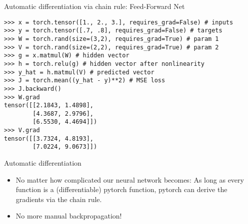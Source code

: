 \begin{vbframe}{Automatic differentiation via chain rule: Feed-Forward Net}
\vspace{-1cm}

\begin{verbatim}
>>> x = torch.tensor([1., 2., 3.], requires_grad=False) # inputs
>>> y = torch.tensor([.7, .8], requires_grad=False) # targets
>>> W = torch.rand(size=(3,2), requires_grad=True) # param 1
>>> V = torch.rand(size=(2,2), requires_grad=True) # param 2
>>> g = x.matmul(W) # hidden vector
>>> h = torch.relu(g) # hidden vector after nonlinearity
>>> y_hat = h.matmul(V) # predicted vector
>>> J = torch.mean((y_hat - y)**2) # MSE loss
>>> J.backward()
>>> W.grad
tensor([[2.1843, 1.4898],
		[4.3687, 2.9796],
		[6.5530, 4.4694]])
>>> V.grad
tensor([[3.7324, 4.8193],
		[7.0224, 9.0673]])

\end{verbatim}


\end{vbframe}

\begin{vbframe}{Automatic differentiation}
\vfill
\begin{itemize}
\item No matter how complicated our neural network becomes: As long as every function is a (differentiable) pytorch function, pytorch can derive the gradients via the chain rule.
\item No more manual backpropagation! 
\end{itemize}
\end{vbframe}

